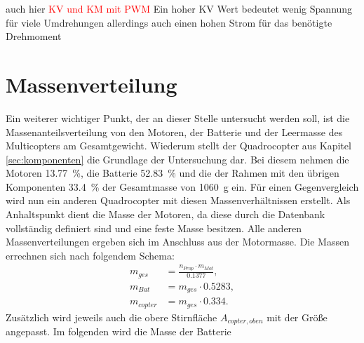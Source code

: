 auch hier \textcolor{red}{KV und KM mit PWM}
Ein hoher KV Wert bedeutet wenig Spannung für viele Umdrehungen allerdings auch einen hohen Strom für das benötigte Drehmoment




\section{Massenverteilung}
\label{sec:massenverteilung}
Ein weiterer wichtiger Punkt, der an dieser Stelle untersucht werden soll, ist die Massenanteilsverteilung von den Motoren, der Batterie und der Leermasse des Multicopters am Gesamtgewicht. Wiederum stellt der Quadrocopter aus Kapitel \ref{sec:komponenten} die Grundlage der Untersuchung dar. Bei diesem nehmen die Motoren \SI{13,77}{\%}, die Batterie \SI{52,83}{\%} und die der Rahmen mit den übrigen Komponenten \SI{33,4}{\%} der Gesamtmasse von \SI{1060}{g} ein. Für einen Gegenvergleich wird nun ein anderen Quadrocopter mit diesen Massenverhältnissen erstellt. Als Anhaltspunkt dient die Masse der Motoren, da diese durch die Datenbank vollständig definiert sind und eine feste Masse besitzen. Alle anderen Massenverteilungen ergeben sich im Anschluss aus der Motormasse.
Die Massen errechnen sich nach folgendem Schema:
\begin{align}
	m_{ges} &= \frac{n_{Prop}\cdot m_{Mot}}{0.1377} , \\
	m_{Bat} &= m_{ges}\cdot 0.5283 , \\
	m_{copter} &= m_{ges}\cdot 0.334.
\end{align}
Zusätzlich wird jeweils auch die obere Stirnfläche \ensuremath{A_{copter,oben}} mit der Größe angepasst. Im folgenden wird die Masse der Batterie 

